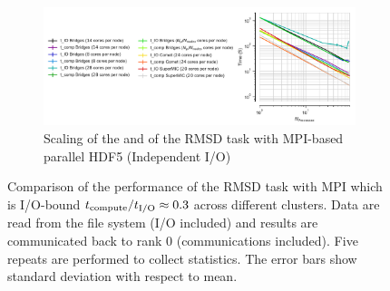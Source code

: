 \begin{figure}[ht!]
\begin{subfigure} {.8\textwidth}
  \includegraphics[width=\linewidth]{figures/Clusters_IO_compute_scaling.pdf}
  \caption{Scaling of the \tcomp and \tIO of the RMSD task with MPI-based parallel HDF5 (Independent I/O)}
  \label{fig:compute-IO-scaling-clusters}
\end{subfigure}
%
\caption{Comparison of the performance of the RMSD task with MPI which is I/O-bound ${t}_{\text{compute}}/{t}_{\text{I/O}} \approx 0.3$
across different clusters. Data are read from the file system (I/O included) and results are communicated back to
rank 0 (communications included). Five repeats are performed to collect statistics. The error bars show
standard deviation with respect to mean.}
\label{fig:MPIwithIO-clusters}
\end{figure} 

